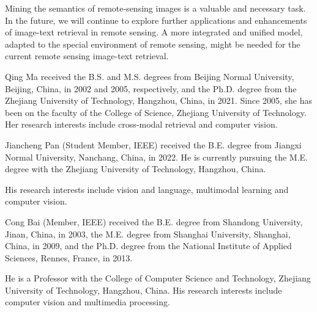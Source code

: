 \documentclass[journal]{IEEEtran}
\begin{document}
Mining the semantics of remote-sensing images is a valuable and necessary task. In the future, we will continue to explore further applications and enhancements of image-text retrieval in remote sensing. A more integrated and unified model, adapted to the special environment of remote sensing, might be needed for the current remote sensing image-text retrieval.





\begin{IEEEbiography}{Qing Ma}
received the B.S. and M.S. degrees from Beijing Normal University, Beijing, China, in 2002 and 2005, respectively, and the Ph.D. degree from the Zhejiang University of Technology, Hangzhou, China, in 2021. Since 2005, she has been on the faculty of the College of Science, Zhejiang University of Technology. Her research interests include cross-modal retrieval and computer vision.
\end{IEEEbiography}
\begin{IEEEbiography}{Jiancheng Pan}
(Student Member, IEEE) received the B.E. degree from Jiangxi Normal University, Nanchang, China, in 2022. He is currently pursuing the M.E. degree with the Zhejiang University of Technology, Hangzhou, China. 

His research interests include vision and language, multimodal learning and computer vision.
\end{IEEEbiography}

\begin{IEEEbiography}{Cong Bai}
(Member, IEEE) received the B.E. degree from Shandong University, Jinan, China, in 2003, the M.E. degree from Shanghai University, Shanghai, China, in 2009, and the Ph.D. degree from the National Institute of Applied Sciences, Rennes, France, in 2013.

He is a Professor with the College of Computer Science and Technology, Zhejiang University of Technology, Hangzhou, China. His research interests include computer vision and multimedia processing.
\end{IEEEbiography}
\end{document}
